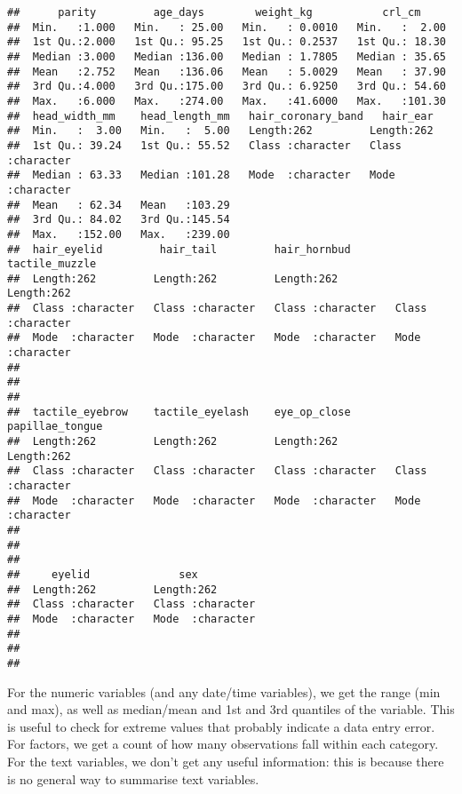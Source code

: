\documentclass[
]{article}
\begin{document}
\begin{verbatim}
##      parity         age_days        weight_kg           crl_cm      
##  Min.   :1.000   Min.   : 25.00   Min.   : 0.0010   Min.   :  2.00  
##  1st Qu.:2.000   1st Qu.: 95.25   1st Qu.: 0.2537   1st Qu.: 18.30  
##  Median :3.000   Median :136.00   Median : 1.7805   Median : 35.65  
##  Mean   :2.752   Mean   :136.06   Mean   : 5.0029   Mean   : 37.90  
##  3rd Qu.:4.000   3rd Qu.:175.00   3rd Qu.: 6.9250   3rd Qu.: 54.60  
##  Max.   :6.000   Max.   :274.00   Max.   :41.6000   Max.   :101.30  
##  head_width_mm    head_length_mm   hair_coronary_band   hair_ear        
##  Min.   :  3.00   Min.   :  5.00   Length:262         Length:262        
##  1st Qu.: 39.24   1st Qu.: 55.52   Class :character   Class :character  
##  Median : 63.33   Median :101.28   Mode  :character   Mode  :character  
##  Mean   : 62.34   Mean   :103.29                                        
##  3rd Qu.: 84.02   3rd Qu.:145.54                                        
##  Max.   :152.00   Max.   :239.00                                        
##  hair_eyelid         hair_tail         hair_hornbud       tactile_muzzle    
##  Length:262         Length:262         Length:262         Length:262        
##  Class :character   Class :character   Class :character   Class :character  
##  Mode  :character   Mode  :character   Mode  :character   Mode  :character  
##                                                                             
##                                                                             
##                                                                             
##  tactile_eyebrow    tactile_eyelash    eye_op_close       papillae_tongue   
##  Length:262         Length:262         Length:262         Length:262        
##  Class :character   Class :character   Class :character   Class :character  
##  Mode  :character   Mode  :character   Mode  :character   Mode  :character  
##                                                                             
##                                                                             
##                                                                             
##     eyelid              sex           
##  Length:262         Length:262        
##  Class :character   Class :character  
##  Mode  :character   Mode  :character  
##                                       
##                                       
## 
\end{verbatim}

For the numeric variables (and any date/time variables), we get the
range (min and max), as well as median/mean and 1st and 3rd quantiles of
the variable. This is useful to check for extreme values that probably
indicate a data entry error. For factors, we get a count of how many
observations fall within each category. For the text variables, we don't
get any useful information: this is because there is no general way to
summarise text variables.
\end{document}
